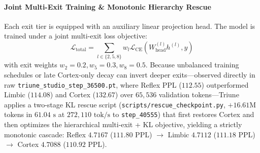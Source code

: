 \documentclass[10pt,twocolumn,letterpaper]{article}
\begin{document}
\paragraph{Joint Multi-Exit Training \& Monotonic Hierarchy Rescue} Each exit tier is equipped with an auxiliary linear projection head. The model is trained under a joint multi-exit loss objective:
\begin{equation}
    \mathcal{L}_{\text{total}} = \sum_{l \in \{2, 5, 8\}} w_l \mathcal{L}_{\text{CE}}(W_{\text{head}}^{(l)} h^{(l)}, y)
\end{equation}
with exit weights $w_2 = 0.2, w_5 = 0.3, w_8 = 0.5$. Because unbalanced training schedules or late Cortex-only decay can invert deeper exits---observed directly in raw \texttt{triune\_studio\_step\_36500.pt}, where Reflex PPL ($112.55$) outperformed Limbic ($114.08$) and Cortex ($132.67$) over $65,536$ validation tokens---Triune applies a two-stage KL rescue script (\texttt{scripts/rescue\_checkpoint.py}, $+16.61\text{M}$ tokens in $61.04\text{ s}$ at $272,110\text{ tok/s}$ to \texttt{step\_40555}) that first restores Cortex and then optimizes the hierarchical multi-exit + KL objective, yielding a strictly monotonic cascade: Reflex $4.7167$ ($111.80$ PPL) $\to$ Limbic $4.7112$ ($111.18$ PPL) $\to$ Cortex $4.7088$ ($110.92$ PPL).
\end{document}
